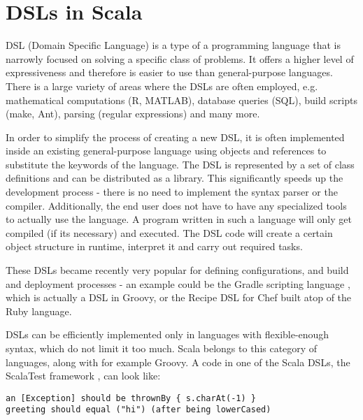 



\section{DSLs in Scala}
\label{sec:dsls}

DSL (Domain Specific Language) is a type of a programming language that is narrowly focused on solving a specific class of problems. It offers a higher level of expressiveness and therefore is easier to use than general-purpose languages. There is a large variety of areas where the DSLs are often employed, e.g. mathematical computations (R, MATLAB), database queries (SQL), build scripts (make, Ant), parsing (regular expressions) and many more.

In order to simplify the process of creating a new DSL, it is often implemented inside an existing general-purpose language using objects and references to substitute the keywords of the language. The DSL is represented by a set of class definitions and can be distributed as a library. This significantly speeds up the development process - there is no need to implement the syntax parser or the compiler. Additionally, the end user does not have to have any specialized tools to actually use the language. A program written in such a language will only get compiled (if its necessary) and executed. The DSL code will create a certain object structure in runtime, interpret it and carry out required tasks.

These DSLs became recently very popular for defining configurations, and build and deployment processes - an example could be the Gradle scripting language \cite{noauthor_gradle_nodate}, which is actually a DSL in Groovy, or the Recipe DSL for Chef \cite{noauthor_chef_nodate} built atop of the Ruby language.

DSLs can be efficiently implemented only in languages with flexible-enough syntax, which do not limit it too much. Scala belongs to this category of languages, along with for example Groovy. A code in one of the Scala DSLs, the ScalaTest framework \cite{noauthor_scalatest:_2017}, can look like:

\lstset{style=Scala}
\begin{lstlisting}
an [Exception] should be thrownBy { s.charAt(-1) }
greeting should equal ("hi") (after being lowerCased)
\end{lstlisting}

